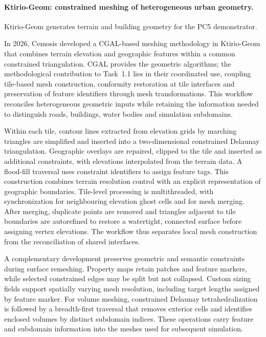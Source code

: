 
\paragraph{Ktirio-Geom: constrained meshing of heterogeneous urban geometry.}
Ktirio-Geom generates terrain and building geometry for the PC5
\KtirioUrbanBuildingContext{} demonstrator.

In 2026, Cemosis developed a CGAL-based meshing methodology in Ktirio-Geom
that combines terrain elevation and geographic features within a common
constrained triangulation. CGAL provides the geometric algorithms; the
methodological contribution to Task~1.1 lies in their coordinated use, coupling
tile-based mesh construction, conformity restoration at tile interfaces and
preservation of feature identifiers through mesh transformations. This workflow
reconciles heterogeneous geometric inputs while retaining
the information needed to distinguish roads, buildings, water bodies and
simulation subdomains.

Within each tile, contour lines extracted from elevation grids by marching
triangles are simplified and inserted into a two-dimensional constrained
Delaunay triangulation. Geographic overlays are repaired, clipped to the tile
and inserted as additional constraints, with elevations interpolated from the
terrain data. A flood-fill traversal uses constraint identifiers to assign
feature tags. This construction combines terrain resolution control with an
explicit representation of geographic boundaries. Tile-level processing is
multithreaded, with synchronization for neighbouring elevation ghost cells
and for mesh merging. After merging, duplicate points are removed and triangles
adjacent to tile boundaries are autorefined to restore a watertight, connected
surface before assigning vertex elevations. The workflow thus separates
local mesh construction from the reconciliation of shared interfaces.

A complementary development preserves geometric and semantic constraints
during surface remeshing. Property maps retain patches and feature markers,
while selected constrained edges may be split but not collapsed. Custom sizing
fields support spatially varying mesh resolution, including target lengths
assigned by feature marker. For volume meshing, constrained Delaunay
tetrahedralization is followed by a breadth-first traversal that removes
exterior cells and identifies enclosed volumes by distinct subdomain indices.
These operations carry feature and subdomain information into the meshes used
for subsequent simulation.

